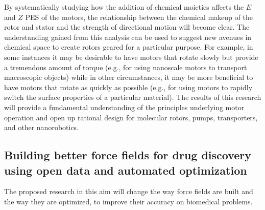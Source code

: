 \documentclass[11pt,notitlepage]{article}
\begin{document}
By systematically studying how the addition of chemical moieties affects
the \(E\) and \(Z\) PES of the motors, the relationship between the
chemical makeup of the rotor and stator and the strength of directional
motion will become clear. The understanding gained from this analysis
can be used to suggest new avenues in chemical space to create rotors
geared for a particular purpose. For example, in some instances it may
be desirable to have motors that rotate slowly but provide a tremendous
amount of torque (e.g., for using nanoscale motors to transport
macroscopic objects) while in other circumstances, it may be more
beneficial to have motors that rotate as quickly as possible (e.g., for
using motors to rapidly switch the surface properties of a particular
material). The results of this research will provide a fundamental
understanding of the principles underlying motor operation and open up
rational design for molecular rotors, pumps, transporters, and other
nanorobotics.

\hypertarget{building-better-force-fields-for-drug-discovery-using-open-data-and-automated-optimization}{%
\subsection{Building better force fields for drug discovery using open
data and automated
optimization}\label{building-better-force-fields-for-drug-discovery-using-open-data-and-automated-optimization}}

{The proposed research in this aim will change the way force fields are
built and the way they are optimized, to improve their accuracy on
biomedical problems.}
\end{document}
